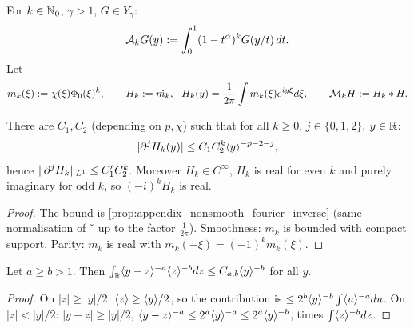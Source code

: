 \begin{definition}
  \label{def:c08_low_operators}
  For $k\in\N_0$, $\gamma>1$, $G\in Y_\gamma$:
  \begin{equation}\label{eqn:linear_averaging_operator}
    \mc A_kG(y):=\int_0^1(1-t^\alpha)^kG(y/t)\,dt .
  \end{equation}
  Let
  \begin{equation}\label{eqn:linear_low_frequency_multipliers}
    m_k(\xi):=\chi(\xi)\Phi_0(\xi)^k,\qquad H_k:=\widecheck{m_k},\ \ H_k(y)=\frac1{2\pi}\int m_k(\xi)e^{iy\xi}d\xi,\qquad
    \mc M_kH:=H_k*H .
  \end{equation}
\end{definition}

\begin{lemma}
  \label{lem:c08_Hk_kernel}
  There are $C_1,C_2$ (depending on $p,\chi$) such that for all $k\ge0$, $j\in\{0,1,2\}$, $y\in\R$:
  \begin{equation}\label{eqn:linear_Hk_kernel}
    |\p^jH_k(y)|\le C_1C_2^k\ang{y}^{-p-2-j},
  \end{equation}
  hence $\|\p^jH_k\|_{L^1}\le C_1'C_2^k$. Moreover $H_k\in C^\infty$, $H_k$ is real for even $k$ and purely imaginary for odd $k$,
  so $(-i)^kH_k$ is real.
\end{lemma}
\begin{proof}
  The bound is \cref{prop:appendix_nonsmooth_fourier_inverse} (same normalisation of $\widecheck{\ }$ up to the
  factor $\frac1{2\pi}$). Smoothness: $m_k$ is bounded with compact support. Parity: $m_k$ is real with
  $m_k(-\xi)=(-1)^km_k(\xi)$.
\end{proof}

\begin{lemma}
  \label{lem:c08_convolution_weight}
  Let $a\ge b>1$. Then $\int_\R\ang{y-z}^{-a}\ang{z}^{-b}dz\le C_{a,b}\ang{y}^{-b}$ for all $y$.
\end{lemma}
\begin{proof}
  On $|z|\ge|y|/2$: $\ang{z}\ge\ang{y}/2$, so the contribution is $\le2^b\ang{y}^{-b}\int\ang{u}^{-a}du$. On $|z|<|y|/2$:
  $|y-z|\ge|y|/2$, $\ang{y-z}^{-a}\le2^a\ang{y}^{-a}\le2^a\ang{y}^{-b}$, times $\int\ang{z}^{-b}dz$.
\end{proof}

